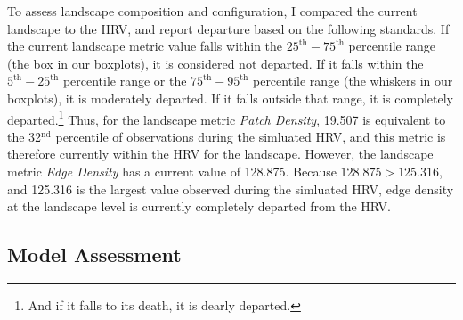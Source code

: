 To assess landscape composition and configuration, I compared the current landscape to the HRV, and report departure based on the following standards. If the current landscape metric value falls within the $25^{\text{th}}-75^{\text{th}}$ percentile range (the box in our boxplots), it is considered not departed. If it falls within the $5^{\text{th}}-25^{\text{th}}$ percentile range or the $75^{\text{th}}-95^{\text{th}}$ percentile range (the whiskers in our boxplots), it is moderately departed. If it falls outside that range, it is completely departed.\footnote{And if it falls to its death, it is dearly departed.} Thus, for the landscape metric \emph{Patch Density}, 19.507 is equivalent to the 32$^{\text{nd}}$ percentile of observations during the simluated HRV, and this metric is therefore currently within the HRV for the landscape. However, the landscape metric \emph{Edge Density} has a current value of 128.875. Because $128.875 > 125.316$, and 125.316 is the largest value observed during the simluated HRV, edge density at the landscape level is currently completely departed from the HRV. 

\clearpage

\subsection{Model Assessment}
\label{subsec:modelassessment}

